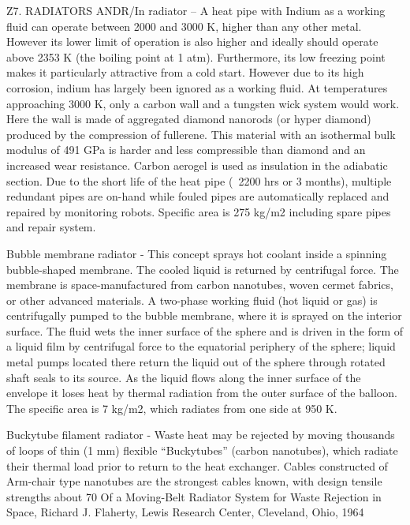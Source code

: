 \documentclass[a4paper]{book}
\begin{document}
Z7. RADIATORS
ANDR/In radiator – A heat pipe with Indium as a working fluid can operate between 2000 and 3000 K, higher than any other metal.  However its lower limit of operation is also higher and ideally should operate above 2353 K (the boiling point at 1 atm). Furthermore, its low freezing point makes it particularly attractive from a cold start.  However due to its high corrosion, indium has largely been ignored as a working fluid.  At temperatures approaching 3000 K, only a carbon wall and a tungsten wick system would work.  Here the wall is made of aggregated diamond nanorods (or hyper diamond) produced by the compression of fullerene.  This material with an isothermal bulk modulus of 491 GPa is harder and less compressible than diamond and an increased wear resistance.  Carbon aerogel is used as insulation in the adiabatic section. Due to the short life of the heat pipe (~2200 hrs or 3 months), multiple redundant pipes are on-hand while fouled pipes are automatically replaced and repaired by monitoring robots. Specific area is 275 kg/m2 including spare pipes and repair system.
 
Bubble membrane radiator - This concept sprays hot coolant inside a spinning bubble-shaped membrane. The cooled liquid is returned by centrifugal force. The membrane is space-manufactured from carbon nanotubes, woven cermet fabrics, or other advanced materials. A two-phase working fluid (hot liquid or gas) is centrifugally pumped to the bubble membrane, where it is sprayed on the interior surface.  The fluid wets the inner surface of the sphere and is driven in the form of a liquid film by centrifugal force to the equatorial periphery of the sphere; liquid metal pumps located there return the liquid out of the sphere through rotated shaft seals to its source. As the liquid flows along the inner surface of the envelope it loses heat by thermal radiation from the outer surface of the balloon. The specific area is 7 kg/m2, which radiates from one side at 950 K.
 
Buckytube filament radiator - Waste heat may be rejected by moving thousands of loops of thin (1 mm) flexible “Buckytubes” (carbon nanotubes), which radiate their thermal load prior to return to the heat exchanger. Cables constructed of Arm-chair type nanotubes are the strongest cables known, with design tensile strengths about 70%
Of a Moving-Belt Radiator System for Waste Rejection in Space, Richard J. Flaherty, Lewis Research Center, Cleveland, Ohio, 1964
 
\end{document}
